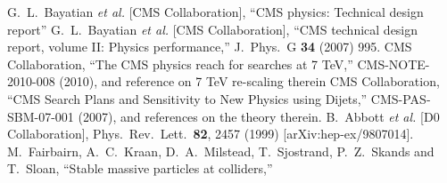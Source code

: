 \documentclass{cmspaper}
\begin{document}
\begin{thebibliography}{0}
  G.~L.~Bayatian {\it et al.}  [CMS Collaboration],
  ``CMS physics: Technical design report''
 \quad
 G.~L.~Bayatian {\it et al.}  [CMS Collaboration],
 ``CMS technical design report, volume II: Physics performance,''
 J.\ Phys.\ G {\bf 34} (2007) 995.
  CMS Collaboration,
  ``The CMS physics reach for searches at 7 TeV,''
  CMS-NOTE-2010-008 (2010), and reference on 7 TeV re-scaling therein
 CMS Collaboration,
 ``CMS Search Plans and Sensitivity to New Physics using Dijets,''
 CMS-PAS-SBM-07-001 (2007), and references on the theory therein.
  B.~Abbott {\it et al.}  [D0 Collaboration],
  Phys.\ Rev.\ Lett.\  {\bf 82}, 2457 (1999)
  [arXiv:hep-ex/9807014].
  M.~Fairbairn, A.~C.~Kraan, D.~A.~Milstead, T.~Sjostrand, P.~Z.~Skands and T.~Sloan,
  ``Stable massive particles at colliders,''

\end{thebibliography}
\end{document}
